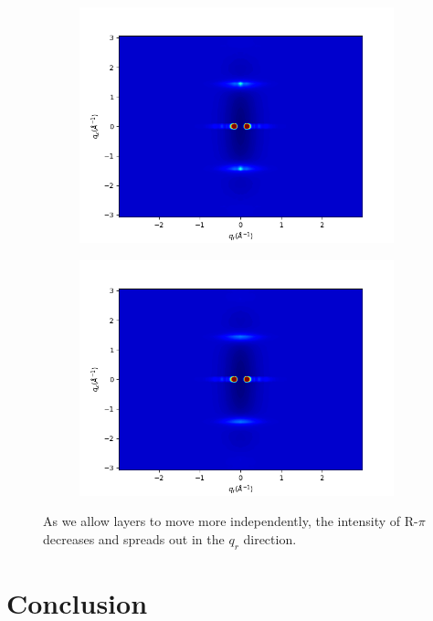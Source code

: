 \documentclass{article}
\begin{document}
\begin{figure}
\begin{subfigure}{0.45\textwidth}
  \includegraphics[width=\textwidth]{rzplot_ld66.png}
  \caption{}\label{fig:rzplot_ld66}
  \end{subfigure}
  \begin{subfigure}{0.45\textwidth} 
  \includegraphics[width=\textwidth]{rzplot_ld1.png}
  \caption{}\label{fig:rzplot_ld1}
  \end{subfigure}
  \caption{As we allow layers to move more independently, the intensity of
  R-$\pi$ decreases and spreads out in the $q_r$ direction.}\label{fig:rzplots}
  \end{figure}


  \section{Conclusion}
 
\end{document}
